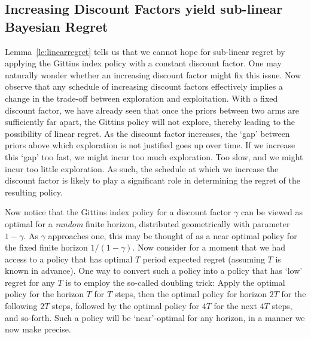 \subsection{Increasing Discount Factors yield sub-linear Bayesian Regret}

Lemma~\ref{le:linearregret} tells us that we cannot hope for sub-linear regret by applying the Gittins index policy with a constant discount factor. One may naturally wonder whether an increasing discount factor might fix this issue. Now observe that any schedule of increasing discount factors effectively implies a change in the trade-off between exploration and exploitation. With a fixed discount factor, we have already seen that once the priors between two arms are sufficiently far apart, the Gittins policy will not explore, thereby leading to the possibility of linear regret. As the discount factor increases, the `gap' between priors above which exploration is not justified goes up over time. If we increase this `gap' too fast, we might incur too much exploration. Too slow, and we might incur too little exploration. As such, the schedule at which we increase the discount factor is likely to play a significant role in determining the regret of the resulting policy. 

Now notice that the Gittins index policy for a discount factor $\gamma$ can be viewed as optimal for a {\em random} finite horizon, distributed geometrically with parameter $1-\gamma$. As $\gamma$ approaches one, this may be thought of as a near optimal policy for the fixed finite horizon $1/(1-\gamma)$. Now consider for a moment that we had access to a policy that has optimal $T$ period expected regret (assuming $T$ is known in advance). One way to convert such a policy into a policy that has `low' regret for any $T$ is to employ the so-called doubling trick: Apply the optimal policy for the horizon $T$ for $T$ steps, then the optimal policy for horizon $2T$ for the following $2T$ steps, followed by the optimal policy for $4T$ for the next $4T$ steps, and so-forth. Such a policy will be `near'-optimal for any horizon, in a manner we now make precise. 

